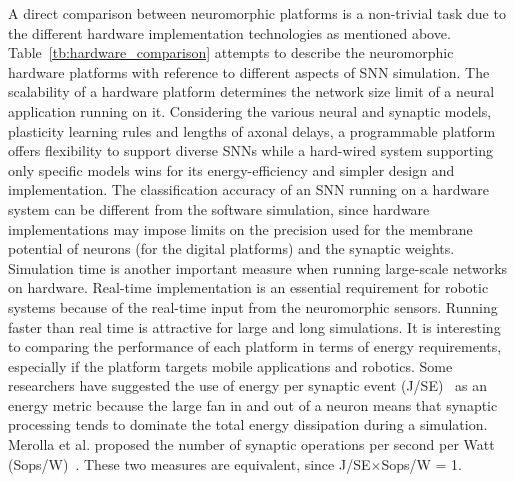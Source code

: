 \documentclass{frontiersENG} %
\begin{document}
A direct comparison between neuromorphic platforms is a non-trivial task due to the different hardware implementation technologies as mentioned above.
Table~\ref{tb:hardware_comparison} attempts to describe the neuromorphic hardware platforms with reference to different aspects of SNN simulation.
The scalability of a hardware platform determines the network size limit of a neural application running on it.
Considering the various neural and synaptic models, plasticity learning rules and lengths of axonal delays, a programmable platform offers flexibility to support diverse SNNs while a hard-wired system supporting only specific models wins for its energy-efficiency and simpler design and implementation.
The classification accuracy of an SNN running on a hardware system can be different from the software simulation, since hardware implementations may impose limits on the precision used for the membrane potential of neurons (for the digital platforms) and the synaptic weights.
Simulation time is another important measure when running large-scale networks on hardware.
Real-time implementation is an essential requirement for robotic systems because of the real-time input from the neuromorphic sensors.
Running faster than real time is attractive for large and long simulations.
It is interesting to comparing the performance of each platform in terms of energy requirements, especially if the platform targets mobile applications and robotics.
Some researchers have suggested the use of energy per synaptic event (J/SE)~\citep{sharp2012power,stromatias2013power} as an energy metric because the large fan in and out of a neuron means that synaptic processing tends to dominate the total energy dissipation during a simulation.
Merolla et al. proposed the number of synaptic operations per second per Watt (Sops/W)~\citep{merolla2014million}.
These two measures are equivalent, since J/SE$\times$Sops/W = 1.
\end{document}
